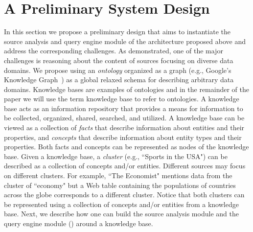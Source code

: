 \documentclass{sig-alternate}
\begin{document}
\section{A Preliminary System Design}
\label{sec:corgraph}
In this section we propose a preliminary design that aims to instantiate the source analysis and query engine module of the architecture proposed above and address the corresponding challenges. As demonstrated, one of the major challenges is reasoning about the content of sources focusing on diverse data domains. We propose using an {\em ontology} organized as a graph (e.g., Google's Knowledge Graph~\cite{kg}) as a global relaxed schema for describing arbitrary data domains. Knowledge bases are examples of ontologies and in the remainder of the paper we will use the term knowledge base to refer to ontologies. A knowledge base acts as an information repository that provides a means for information to be collected, organized, shared, searched, and utilized. A knowledge base can be viewed as a collection of {\em facts} that describe information about entities and their properties, and {\em concepts} that describe information about entity types and their properties. Both facts and concepts can be represented as nodes of the knowledge base. Given a knowledge base, a {\em cluster} (e.g., ``Sports in the USA") can be described as a collection of concepts and/or entities. Different sources may focus on different clusters. For example, ``The Economist" mentions data from the cluster of  ``economy" but a Web table containing the populations of countries across the globe corresponds to a different cluster. Notice that both clusters can be represented using a collection of concepts and/or entities from a knowledge base.  Next, we describe how one can build the source analysis module and the query engine module () around a knowledge base.
\end{document}
